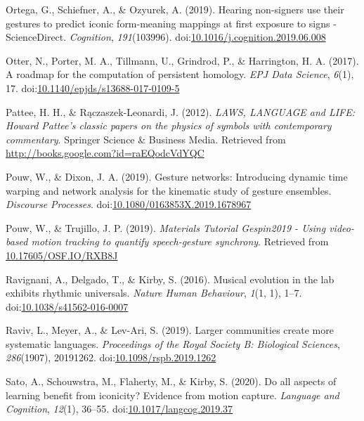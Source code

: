 \documentclass[
  man, noextraspace,floatsintext]{apa6}
\newlength{\cslhangindent}
\newenvironment{cslreferences}%
  {\setlength{\parindent}{0pt}%
  \everypar{\setlength{\hangindent}{\cslhangindent}}\ignorespaces}%
  {\par}
\begin{document}
\begin{cslreferences}
\leavevmode\hypertarget{ref-ortegaHearingNonsignersUse2019}{}%
Ortega, G., Schiefner, A., \& Ozyurek, A. (2019). Hearing non-signers use their gestures to predict iconic form-meaning mappings at first exposure to signs - ScienceDirect. \emph{Cognition}, \emph{191}(103996). doi:\href{https://doi.org/10.1016/j.cognition.2019.06.008}{10.1016/j.cognition.2019.06.008}

\leavevmode\hypertarget{ref-otterRoadmapComputationPersistent2017}{}%
Otter, N., Porter, M. A., Tillmann, U., Grindrod, P., \& Harrington, H. A. (2017). A roadmap for the computation of persistent homology. \emph{EPJ Data Science}, \emph{6}(1), 17. doi:\href{https://doi.org/10.1140/epjds/s13688-017-0109-5}{10.1140/epjds/s13688-017-0109-5}

\leavevmode\hypertarget{ref-patteeLAWSLANGUAGELIFE2012}{}%
Pattee, H. H., \& Rączaszek-Leonardi, J. (2012). \emph{LAWS, LANGUAGE and LIFE: Howard Pattee's classic papers on the physics of symbols with contemporary commentary}. Springer Science \& Business Media. Retrieved from \url{http://books.google.com?id=raEQodcVdYQC}

\leavevmode\hypertarget{ref-pouwGestureNetworksIntroducing2019}{}%
Pouw, W., \& Dixon, J. A. (2019). Gesture networks: Introducing dynamic time warping and network analysis for the kinematic study of gesture ensembles. \emph{Discourse Processes}. doi:\href{https://doi.org/10.1080/0163853X.2019.1678967}{10.1080/0163853X.2019.1678967}

\leavevmode\hypertarget{ref-pouwMaterialsTutorialGespin20192019}{}%
Pouw, W., \& Trujillo, J. P. (2019). \emph{Materials Tutorial Gespin2019 - Using video-based motion tracking to quantify speech-gesture synchrony}. Retrieved from \url{10.17605/OSF.IO/RXB8J}

\leavevmode\hypertarget{ref-ravignaniMusicalEvolutionLab2016}{}%
Ravignani, A., Delgado, T., \& Kirby, S. (2016). Musical evolution in the lab exhibits rhythmic universals. \emph{Nature Human Behaviour}, \emph{1}(1, 1), 1--7. doi:\href{https://doi.org/10.1038/s41562-016-0007}{10.1038/s41562-016-0007}

\leavevmode\hypertarget{ref-ravivLargerCommunitiesCreate2019}{}%
Raviv, L., Meyer, A., \& Lev-Ari, S. (2019). Larger communities create more systematic languages. \emph{Proceedings of the Royal Society B: Biological Sciences}, \emph{286}(1907), 20191262. doi:\href{https://doi.org/10.1098/rspb.2019.1262}{10.1098/rspb.2019.1262}

\leavevmode\hypertarget{ref-satoAllAspectsLearning2020}{}%
Sato, A., Schouwstra, M., Flaherty, M., \& Kirby, S. (2020). Do all aspects of learning benefit from iconicity? Evidence from motion capture. \emph{Language and Cognition}, \emph{12}(1), 36--55. doi:\href{https://doi.org/10.1017/langcog.2019.37}{10.1017/langcog.2019.37}


\end{cslreferences}
\end{document}
